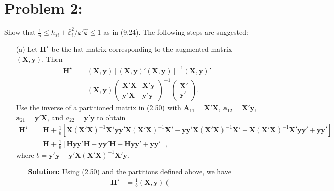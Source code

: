 \documentclass[11pt]{article}
\begin{document}
\section*{Problem 2:}
Show that $\frac{1}{n}\leq h_{ii} + \widehat{\varepsilon}_i^2 / \widehat{\bm\varepsilon}'\widehat{\bm\varepsilon} \leq 1$ as in (9.24).  The following steps are suggested:
\begin{itemize}
\item[(a)] Let $\mathbf{H}^\star$ be the hat matrix corresponding to the augmented matrix $(\mathbf{X},\mathbf{y})$.  Then
\begin{align*}
\mathbf{H}^\star &= (\mathbf{X},\mathbf{y})\left[(\mathbf{X},\mathbf{y})'(\mathbf{X},\mathbf{y})\right]^{-1}(\mathbf{X},\mathbf{y})' \\
&= (\mathbf{X},\mathbf{y})\left(\begin{matrix}
\mathbf{X}'\mathbf{X} & \mathbf{X}'\mathbf{y} \\
\mathbf{y}'\mathbf{X} & \mathbf{y}'\mathbf{y}
\end{matrix}\right)^{-1}
\left(\begin{matrix}
\mathbf{X}' \\ \mathbf{y}'
\end{matrix}\right).
\end{align*}
Use the inverse of a partitioned matrix in (2.50) with $\mathbf{A}_{11} = \mathbf{X}'\mathbf{X}$, $\mathbf{a}_{12} = \mathbf{X}'\mathbf{y}$, $\mathbf{a}_{21} = \mathbf{y}'\mathbf{X}$, and $a_{22} = \mathbf{y}'\mathbf{y}$ to obtain
\begin{align*}
\mathbf{H}^\star &= \mathbf{H} + \frac{1}{b}\left[\mathbf{X}(\mathbf{X}'\mathbf{X})^{-1}\mathbf{X}'\mathbf{y}\mathbf{y}'\mathbf{X}(\mathbf{X}'\mathbf{X})^{-1}\mathbf{X}' - \mathbf{y}\mathbf{y}'\mathbf{X}(\mathbf{X}'\mathbf{X})^{-1}\mathbf{X}' - \mathbf{X}(\mathbf{X}'\mathbf{X})^{-1}\mathbf{X}'\mathbf{y}\mathbf{y}' + \mathbf{y}\mathbf{y}'\right] \\
&= \mathbf{H} + \frac{1}{b}\left[\mathbf{H}\mathbf{y}\mathbf{y}'\mathbf{H} - \mathbf{y}\mathbf{y}'\mathbf{H} - \mathbf{H}\mathbf{y}\mathbf{y}' + \mathbf{y}\mathbf{y}'\right],
\end{align*}
where $b = \mathbf{y}'\mathbf{y} - \mathbf{y}'\mathbf{X}(\mathbf{X}'\mathbf{X})^{-1}\mathbf{X}'\mathbf{y}$.
\begin{itemize}
\item[] \textbf{Solution:} Using (2.50) and the partitions defined above, we have
\begin{align*}
\mathbf{H}^\star &= \frac{1}{b}(\mathbf{X},\mathbf{y})\left(\begin{matrix}

\end{matrix}
\end{align*}
\end{itemize}
\end{itemize}
\end{document}
